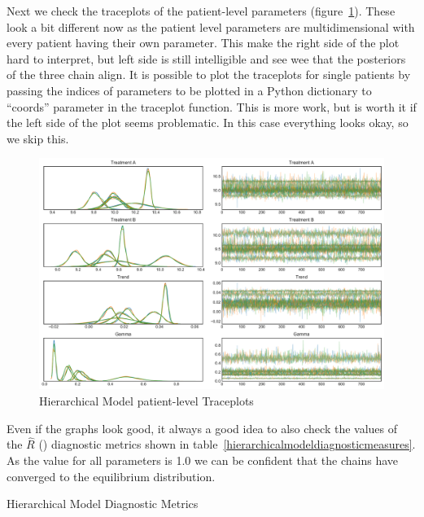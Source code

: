 \documentclass[12pt,a4paper,leqno]{report}
\theoremstyle{plain}
\theoremstyle{definition}
\theoremstyle{remark}
\begin{document}
Next we check the traceplots of the patient-level parameters (figure\
\ref{hierarchicalmodelpatienttraceplots}). These look a bit different now as the patient
level parameters are multidimensional with every patient having their own
parameter. This make the right side of the plot hard to interpret, but left side is
still intelligible and see wee that the posteriors of the three chain align. It is
possible to plot the traceplots for single patients by passing the indices of parameters
to be plotted in a Python dictionary to ``coords'' parameter in the traceplot function.
This is more work, but is worth it if the left side of the plot seems problematic.
In this case everything looks okay, so we skip this.

\bigskip
\begin{figure}[H]
    \caption{Hierarchical Model patient-level Traceplots}\label{hierarchicalmodelpatienttraceplots}
    \bigskip
    \includegraphics[width=\textwidth,height=\textheight,keepaspectratio]{hierarchical_model_patient_level_traceplot.pdf}
\end{figure}
\bigskip

Even if the graphs look good, it always a good idea to also check the values of the
\(\hat{R}\) (\pyv{r_hat}) diagnostic metrics shown in table\ \ref{hierarchicalmodeldiagnosticmeasures}. As
the value for all parameters is 1.0 we can be confident that the chains have converged to
the equilibrium distribution.


\bigskip
\begin{table}[H]
    \caption{Hierarchical Model Diagnostic Metrics}\label{hierarchicalmodeldiagnosticmeasures}
    \bigskip
    \centering
    \resizebox{!}{3.2in}{%
    
    }
\end{table}
\smallskip
\end{document}
